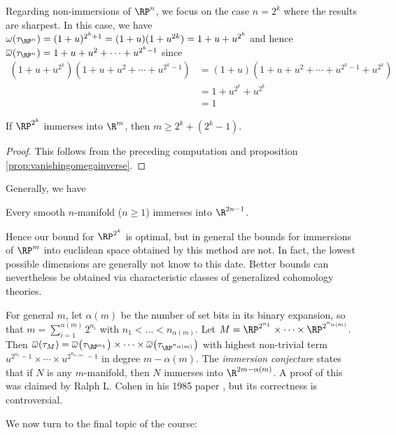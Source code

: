 Regarding non-immersions of $\RP^n$, we focus on the case $n = 2^k$ where the results are sharpest.
In this case, we have $\omega(\tau_{\RP^n}) = (1 + u)^{2^k + 1} = (1 + u)(1 + u^{2k}) = 1 + u + u^{2^k}$ and hence $\overline{\omega}(\tau_{\RP^n}) = 1 + u + u^2 + \cdots + u^{2^k - 1}$ since
\begin{align*}
	(1 + u + u^{2^k})(1 + u + u^2 + \cdots + u^{2^k - 1}) &= (1 + u)(1 + u + u^2 + \cdots + u^{2^k - 1} + u^{2^k}) \\
														  &= 1 + u^{2^k} + u^{2^k} \\
														  &= 1
\end{align*}
\begin{corollary}
	If $\RP^{2^k}$ immerses into $\R^m$, then $m \geq 2^k + (2^k - 1)$.
\end{corollary}
\begin{proof}
	This follows from the preceding computation and proposition \ref{prop:vanishingomegainverse}.
\end{proof}
Generally, we have
\begin{theorem}[Whitney]
	Every smooth $n$-manifold ($n \geq 1$) immerses into $\R^{2n - 1}$.
\end{theorem}
Hence our bound for $\RP^{2^k}$ is optimal, but in general the bounds for immersions of $\RP^m$ into euclidean space obtained by this method are not.
In fact, the lowest possible dimensions are generally not know to this date.
Better bounds can nevertheless be obtained via characteristic classes of generalized cohomology theories.

For general $m$, let $\alpha(m)$ be the number of set bits in its binary expansion, so that $m = \sum_{i = 1}^{\alpha(m)} 2^{n_i}$ with $n_1 < \ldots < n_{\alpha(m)}$.
Let $M = \RP^{2^{n_1}} \times \cdots \times \RP^{2^{n_{\alpha(m)}}}$.
Then $\overline{\omega}(\tau_M) = \overline{\omega}\big(\tau_{\RP^{n_1}}\big) \times \cdots \times \overline{\omega}\big(\tau_{\RP^{n_{\alpha(m)}}}\big)$ with highest non-trivial term $u^{2^{n_1} - 1} \times \cdots \times u^{2^{n_{\alpha(m)}} - 1}$ in degree $m - \alpha(m)$.
The \emph{immersion conjecture} states that if $N$ is any $m$-manifold, then $N$ immerses into $\R^{2m - \alpha(m)}$.
A proof of this was claimed by Ralph L. Cohen in his 1985 paper \cite{cohen_immersion_1985}, but its correctness is controversial.

We now turn to the final topic of the course:

